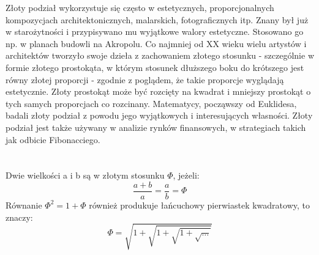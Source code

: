 \documentclass{article}
\begin{document}
Złoty podział wykorzystuje się często w estetycznych, proporcjonalnych kompozycjach architektonicznych, malarskich, fotograficznych itp. Znany był już w starożytności i przypisywano mu wyjątkowe walory estetyczne. Stosowano go np. w planach budowli na Akropolu. Co najmniej od XX wieku wielu artystów i architektów tworzyło swoje dzieła z zachowaniem złotego stosunku - szczególnie w formie złotego prostokąta, w którym stosunek dłuższego boku do krótszego jest równy złotej proporcji - zgodnie z poglądem, że takie proporcje wyglądają estetycznie. Złoty prostokąt może być rozcięty na kwadrat i mniejszy prostokąt o tych samych proporcjach co rozcinany. Matematycy, począwszy od Euklidesa, badali złoty podział z powodu jego wyjątkowych i interesujących własności. Złoty podział jest także używany w analizie rynków finansowych, w strategiach takich jak odbicie Fibonacciego.
\\\\\\
 Dwie wielkości a i b są w złotym stosunku $\Phi$, jeżeli:
\begin{equation}
\frac{a+b}{a} = \frac{a}{b} = \Phi
\end{equation}
 Równanie \begin{math} \Phi^{2} = 1 + \Phi \end{math} również produkuje łańcuchowy pierwiastek kwadratowy, to znaczy:
\begin{equation}
\Phi = \sqrt{ 1+\sqrt{1+{\sqrt{1+{\sqrt{\ldots}}}}}}
\end{equation}
\end{document}
